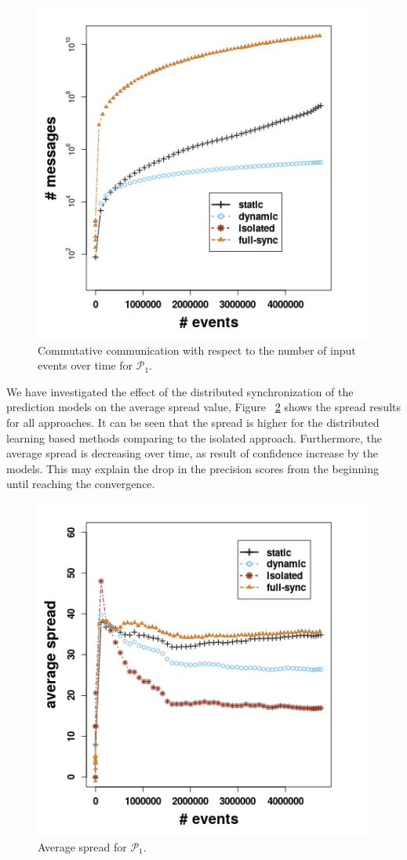 \begin{center}
	
	\begin{figure}[h]
		
		\includegraphics[width=.5\textwidth]{figures/messages_p1.png}
		
		\caption{Commutative communication with respect to the number of input events over time for $\mathcal{P}_1$.}
		\label{fig:comm}
	\end{figure}
\end{center}


We have investigated the effect of the distributed synchronization of the prediction models on the average spread value, Figure  ~\ref{fig:spread}  shows the spread results for all approaches. It can be seen that the spread is higher for the distributed learning based methods comparing to the isolated approach. Furthermore, the average spread is decreasing over time, as result of confidence increase by the models. This may explain the drop in the precision scores from the beginning until reaching the convergence. 

\begin{center}
	
	\begin{figure}[h]
		
		\includegraphics[width=.5\textwidth]{figures/spread_p1.png}
		
		\caption{Average spread for $\mathcal{P}_1$.}
		\label{fig:spread}
	\end{figure}
\end{center}





